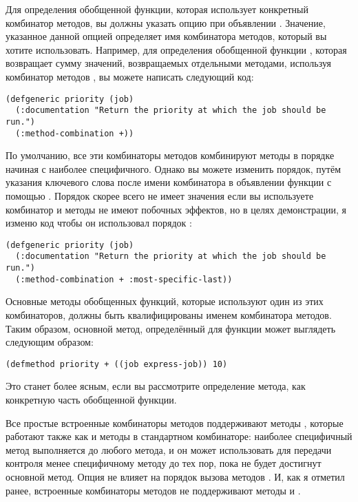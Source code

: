 Для определения обобщенной функции, которая использует конкретный комбинатор методов, вы
должны указать опцию  при объявлении .
Значение, указанное данной опцией определяет имя комбинатора методов, который вы хотите
использовать.  Например, для определения обобщенной функции , которая
возвращает сумму значений, возвращаемых отдельными методами, используя комбинатор методов
\code{+}, вы можете написать следующий код:

\begin{lstlisting}
(defgeneric priority (job)
  (:documentation "Return the priority at which the job should be run.")
  (:method-combination +))
\end{lstlisting}

По умолчанию, все эти комбинаторы методов комбинируют методы в порядке начиная с наиболее
специфичного.  Однако вы можете изменить порядок, путём указания ключевого слова
 после имени комбинатора в объявлении функции с помощью
.  Порядок скорее всего не имеет значения если вы используете комбинатор
\code{+} и методы не имеют побочных эффектов, но в целях демонстрации, я изменю код
 чтобы он использовал порядок :

\begin{lstlisting}
(defgeneric priority (job)
  (:documentation "Return the priority at which the job should be run.")
  (:method-combination + :most-specific-last))
\end{lstlisting}

Основные методы обобщенных функций, которые используют один из этих комбинаторов, должны
быть квалифицированы именем комбинатора методов.  Таким образом, основной метод,
определённый для функции  может выглядеть следующим образом:

\begin{lstlisting}
(defmethod priority + ((job express-job)) 10)
\end{lstlisting}

Это станет более ясным, если вы рассмотрите определение метода, как конкретную часть
обобщенной функции.

Все простые встроенные комбинаторы методов поддерживают методы , которые
работают также как и методы  в стандартном комбинаторе: наиболее специфичный
метод  выполняется до любого метода, и он может использовать
 для передачи контроля менее специфичному методу  до
тех пор, пока не будет достигнут основной метод.  Опция  не
влияет на порядок вызова методов .  И, как я отметил ранее, встроенные
комбинаторы методов не поддерживают методы  и .

